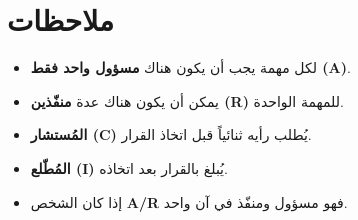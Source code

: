 \documentclass[11pt,a4paper]{article}
\begin{document}
\section{ملاحظات}
\label{sec:notes}

\begin{itemize}
    \item لكل مهمة يجب أن يكون هناك \textbf{مسؤول واحد فقط (A)}.
    \item يمكن أن يكون هناك عدة \textbf{منفّذين (R)} للمهمة الواحدة.
    \item \textbf{المُستشار (C)} يُطلب رأيه ثنائياً قبل اتخاذ القرار.
    \item \textbf{المُطّلع (I)} يُبلغ بالقرار بعد اتخاذه.
    \item إذا كان الشخص \textbf{A/R} فهو مسؤول ومنفّذ في آن واحد.
\end{itemize}
\end{document}
